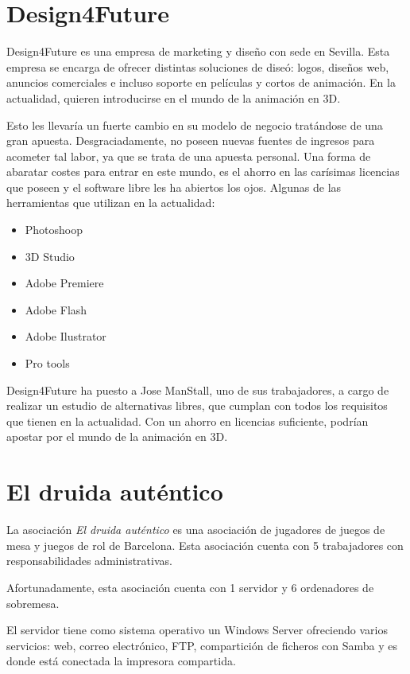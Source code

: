 \documentclass[a4paper]{article}
\begin{document}
\section{Design4Future}
Design4Future es una empresa de marketing y diseño con sede en Sevilla. Esta empresa se
encarga de ofrecer distintas soluciones de diseó: logos, diseños web, anuncios comerciales e incluso soporte en películas y cortos de animación. En la actualidad, quieren introducirse en el mundo de la animación en 3D.

Esto les llevaría un fuerte cambio en su modelo de negocio tratándose de una gran apuesta. Desgraciadamente, no poseen nuevas fuentes de ingresos para acometer tal labor, ya que se trata de una apuesta personal. Una forma de abaratar costes para entrar en este mundo, es el ahorro en las carísimas licencias que poseen y el software libre les ha abiertos los ojos. Algunas de las
herramientas que utilizan en la actualidad:

\begin{itemize}
\item Photoshoop
\item 3D Studio
\item Adobe Premiere
\item Adobe Flash
\item Adobe Ilustrator
\item Pro tools
\end{itemize}

Design4Future ha puesto a Jose ManStall, uno de sus trabajadores, a cargo de realizar un
estudio de alternativas libres, que cumplan con todos los requisitos que tienen en la actualidad.
Con un ahorro en licencias suficiente, podrían apostar por el mundo de la animación en 3D.



  \section{El druida auténtico}
  La asociación \textit{El druida auténtico} es una asociación de jugadores de juegos de mesa y juegos de rol de Barcelona.
  Esta asociación cuenta con 5 trabajadores con responsabilidades administrativas.
  
  Afortunadamente, esta asociación cuenta con 1 servidor y 6 ordenadores de sobremesa.
  
  El servidor tiene como sistema operativo un Windows Server ofreciendo varios servicios: web, correo electrónico, FTP,
  compartición de ficheros con Samba y es donde está conectada la impresora compartida.
  
\end{document}
